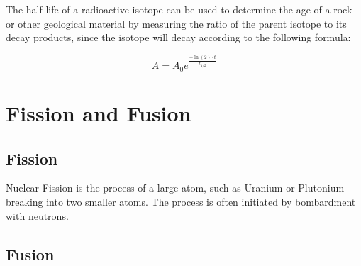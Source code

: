 The half-life of a radioactive isotope can be used to determine the age of a rock or other geological material by measuring the ratio of the parent isotope to its decay products, since the isotope will decay according to the following formula: 

	\begin{mdframed}[backgroundcolor=orange!20!white]
	\begin{equation}
		A = A_0 e^{\frac{-\ln(2)\cdot t}{t_{1/2}}}
		\label{eqn:halflife}
	\end{equation}
\end{mdframed}



\section{Fission and Fusion}
\subsection{Fission}
Nuclear Fission is the process of a large atom, such as Uranium or Plutonium breaking into two smaller atoms.  The process is often initiated by bombardment with neutrons.  



\subsection{Fusion}



	


